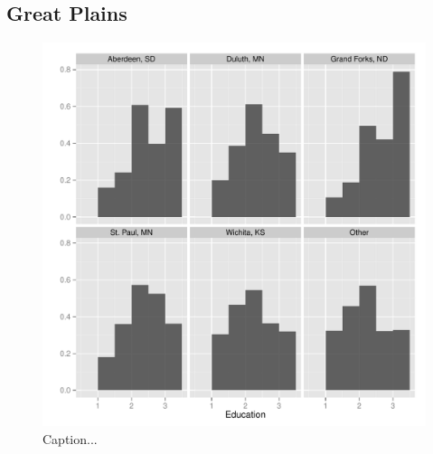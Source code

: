 \documentclass[11pt]{article}\usepackage{knitr}
\begin{document}
\subsection*{Great Plains}
\begin{knitrout}
\color{fgcolor}\begin{figure}[H]

\includegraphics[width=\maxwidth]{figure/gp_one} \caption[Caption]{Caption...\label{fig:gp_one}}
\end{figure}


\end{knitrout}
\end{document}
